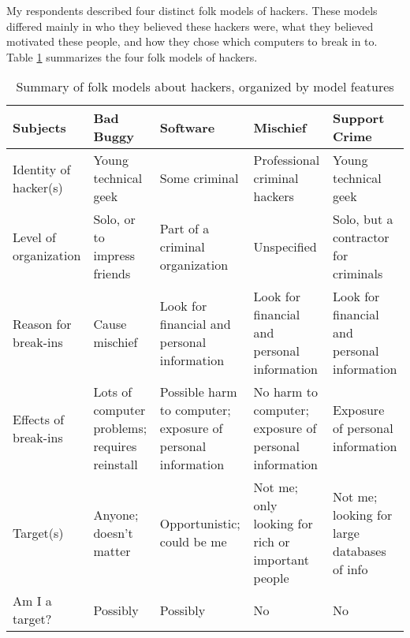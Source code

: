 \documentclass[preprint]{oscmjournal}
\begin{document}
My respondents described four distinct folk models of hackers. These models differed mainly in who they believed these hackers were, what they believed motivated these people, and how they chose which computers to break in to. Table \ref{table2:data} summarizes the four folk models of hackers.\\
\begin{table}[ht]
\centering
\begin{tabular}{p{2cm}|p{2cm}|p{2cm}|p{2cm}|p{2cm}}
     \hline
    Subjects  & Bad Buggy & Software & Mischief & Support Crime \\
     \hline
    Identity of hacker(s) & Young technical geek & Some criminal & Professional criminal hackers &
Young technical geek \\
     \hline
     Level of organization & Solo, or to impress friends & Part of a criminal organization & Unspecified & Solo, but a contractor for criminals \\
     \hline
     Reason for break-ins & Cause mischief & Look for financial and personal information & Look for financial and personal information & Look for financial and personal information \\
     \hline
Effects of break-ins & Lots of computer problems; requires reinstall & Possible harm to computer; exposure of personal information  & No harm to computer; exposure of personal information & Exposure of personal information \\
    \hline
    Target(s) & Anyone; doesn’t matter & Opportunistic; could be me & Not me; only looking for rich or important people & Not me; looking for large databases of info \\
     \hline
     Am I a target?  &Possibly &Possibly & No & No \\
      \hline
\end{tabular}
\caption{Summary of folk models about hackers, organized by model features }
\label{table2:data}
\end{table}
    
\end{document}
